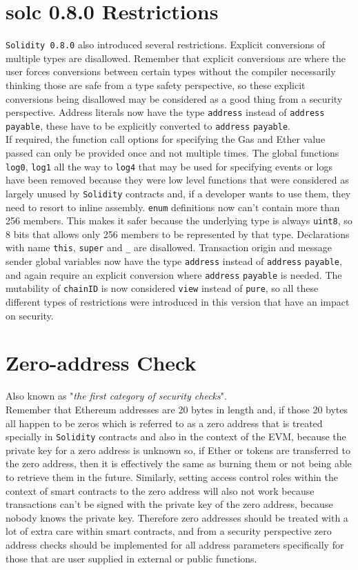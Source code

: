 \section{solc 0.8.0 Restrictions}
\verb|Solidity 0.8.0| also introduced several restrictions. Explicit conversions of multiple types are disallowed. Remember that explicit conversions are where the user forces conversions between certain types without the compiler necessarily thinking those are safe from a type safety perspective, so these explicit conversions being disallowed may be considered as a good thing from a security perspective. Address literals now have the type \verb|address| instead of \verb|address| \verb|payable|, these have to be explicitly converted to \verb|address| \verb|payable|.\\

If required, the function call options for specifying the Gas and Ether value passed can only be provided once and not multiple times. The global functions \verb|log0|, \verb|log1| all the way to \verb|log4| that may be used for specifying events or logs have been removed because they were low level functions that were considered as largely unused by \verb|Solidity| contracts and, if a developer wants to use them, they need to resort to inline assembly. \verb|enum| definitions now can't contain more than 256 members. This makes it safer because the underlying type is always \verb|uint8|, so 8 bits that allows only 256 members to be represented by that type. Declarations with name \verb|this|, \verb|super| and \verb|_| are disallowed. Transaction origin and message sender global variables now have the type \verb|address| instead of \verb|address| \verb|payable|, and again require an explicit conversion where \verb|address| \verb|payable| is needed. The mutability of \verb|chainID| is now considered \verb|view| instead of \verb|pure|, so all these different types of restrictions were introduced in this version that have an impact on security.

\section{Zero-address Check}
Also known as "\textit{the first category of security checks}".\\

Remember that Ethereum addresses are 20 bytes in length and, if those 20 bytes all happen to be zeros which is referred to as a zero address that is treated specially in \verb|Solidity| contracts and also in the context of the EVM, because the private key for a zero address is unknown so, if Ether or tokens are transferred to the zero address, then it is effectively the same as burning them or not being able to retrieve them in the future. Similarly, setting access control roles within the context of smart contracts to the zero address will also not work because transactions can't be signed with the private key of the zero address, because nobody knows the private key. Therefore zero addresses should be treated with a lot of extra care within smart contracts, and from a security perspective zero address checks should be implemented for all address parameters specifically for those that are user supplied in external or public functions.

